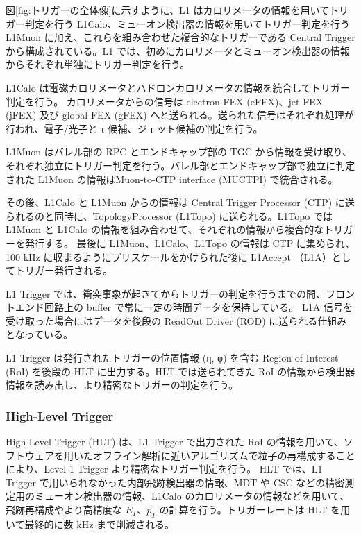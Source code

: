 図\ref{fig:トリガーの全体像}に示すように、L1 はカロリメータの情報を用いてトリガー判定を行う L1Calo、ミューオン検出器の情報を用いてトリガー判定を行う L1Muon に加え、これらを組み合わせた複合的なトリガーである Central Trigger から構成されている。L1 では、初めにカロリメータとミューオン検出器の情報からそれぞれ単独にトリガー判定を行う。

L1Calo は電磁カロリメータとハドロンカロリメータの情報を統合してトリガー判定を行う。
カロリメータからの信号は electron FEX (eFEX)、jet FEX (jFEX) 及び global FEX (gFEX) へと送られる。送られた信号はそれぞれ処理が行われ、電子/光子と τ 候補、ジェット候補の判定を行う。

L1Muon はバレル部の RPC とエンドキャップ部の TGC から情報を受け取り、それぞれ独立にトリガー判定を行う。バレル部とエンドキャップ部で独立に判定された L1Muon の情報はMuon-to-CTP interface (MUCTPI) で統合される。

その後、L1Calo と L1Muon からの情報は Central Trigger Processor (CTP) に送られるのと同時に、TopologyProcessor (L1Topo) に送られる。L1Topo では L1Muon と L1Calo の情報を組み合わせて、それぞれの情報から複合的なトリガーを発行する。
最後に L1Muon、L1Calo、L1Topo の情報は CTP に集められ、100 kHz に収まるようにプリスケールをかけられた後に L1Accept （L1A）としてトリガー発行される。

L1 Trigger では、衝突事象が起きてからトリガーの判定を行うまでの間、フロントエンド回路上の buffer で常に一定の時間データを保持している。
L1A 信号を受け取った場合にはデータを後段の ReadOut Driver (ROD) に送られる仕組みとなっている。

L1 Trigger は発行されたトリガーの位置情報 (η, φ) を含む Region of Interest (RoI) を後段の HLT に出力する。HLT では送られてきた RoI の情報から検出器情報を読み出し、より精密なトリガーの判定を行う。

\subsubsection{High-Level Trigger}
High-Level Trigger (HLT) は、L1 Trigger で出力された RoI の情報を用いて、ソフトウェアを用いたオフライン解析に近いアルゴリズムで粒子の再構成することにより、Level-1 Trigger より精密なトリガー判定を行う。
HLT では、L1 Trigger で用いられなかった内部飛跡検出器の情報、MDT や CSC などの精密測定用のミューオン検出器の情報、L1Calo のカロリメータの情報などを用いて、飛跡再構成やより高精度な $E_T$、$p_T$ の計算を行う。トリガーレートは HLT を用いて最終的に数 kHz まで削減される。




